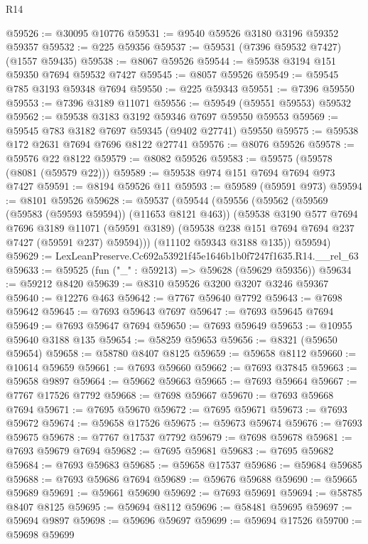 \begin{lexlean}{R14}
\begin{coremodule}
@59526 := @30095 @10776
@59531 := @9540 @59526 @3180 @3196 @59352 @59357
@59532 := @225 @59356
@59537 := @59531 (@7396 @59532 @7427) (@1557 @59435)
@59538 := @8067 @59526
@59544 := @59538 @3194 @151 @59350 @7694 @59532 @7427
@59545 := @8057 @59526
@59549 := @59545 @785 @3193 @59348 @7694
@59550 := @225 @59343
@59551 := @7396 @59550
@59553 := @7396 @3189 @11071
@59556 := @59549 (@59551 @59553) @59532
@59562 := @59538 @3183 @3192 @59346 @7697 @59550 @59553
@59569 := @59545 @783 @3182 @7697 @59345 (@9402 @27741) @59550
@59575 := @59538 @172 @2631 @7694 @7696 @8122 @27741
@59576 := @8076 @59526
@59578 := @59576 @22 @8122
@59579 := @8082 @59526
@59583 := @59575 (@59578 (@8081 (@59579 @22)))
@59589 := @59538 @974 @151 @7694 @7694 @973 @7427
@59591 := @8194 @59526 @11
@59593 := @59589 (@59591 @973)
@59594 := @8101 @59526
@59628 := @59537
    (@59544
      (@59556
        (@59562
          (@59569 (@59583 (@59593 @59594)) (@11653 @8121 @463))
          (@59538
            @3190
            @577
            @7694
            @7696
            @3189
            @11071
            (@59591 @3189)
            (@59538 @238 @151 @7694 @7694 @237 @7427 (@59591 @237) @59594)))
        (@11102 @59343 @3188 @135))
      @59594)
@59629 := LexLeanPreserve.Cc692a53921f45e1646b1b0f7247f1635.R14.__rel_63
@59633 := @59525 (fun ("_" : @59213) => @59628 (@59629 @59356))
@59634 := @59212 @8420
@59639 := @8310 @59526 @3200 @3207 @3246 @59367
@59640 := @12276 @463
@59642 := @7767 @59640 @7792
@59643 := @7698 @59642
@59645 := @7693 @59643 @7697
@59647 := @7693 @59645 @7694
@59649 := @7693 @59647 @7694
@59650 := @7693 @59649
@59653 := @10955 @59640 @3188 @135
@59654 := @58259 @59653
@59656 := @8321 (@59650 @59654)
@59658 := @58780 @8407 @8125
@59659 := @59658 @8112
@59660 := @10614 @59659
@59661 := @7693 @59660
@59662 := @7693 @37845
@59663 := @59658 @9897
@59664 := @59662 @59663
@59665 := @7693 @59664
@59667 := @7767 @17526 @7792
@59668 := @7698 @59667
@59670 := @7693 @59668 @7694
@59671 := @7695 @59670
@59672 := @7695 @59671
@59673 := @7693 @59672
@59674 := @59658 @17526
@59675 := @59673 @59674
@59676 := @7693 @59675
@59678 := @7767 @17537 @7792
@59679 := @7698 @59678
@59681 := @7693 @59679 @7694
@59682 := @7695 @59681
@59683 := @7695 @59682
@59684 := @7693 @59683
@59685 := @59658 @17537
@59686 := @59684 @59685
@59688 := @7693 @59686 @7694
@59689 := @59676 @59688
@59690 := @59665 @59689
@59691 := @59661 @59690
@59692 := @7693 @59691
@59694 := @58785 @8407 @8125
@59695 := @59694 @8112
@59696 := @58481 @59695
@59697 := @59694 @9897
@59698 := @59696 @59697
@59699 := @59694 @17526
@59700 := @59698 @59699

\end{coremodule}
\end{lexlean}
